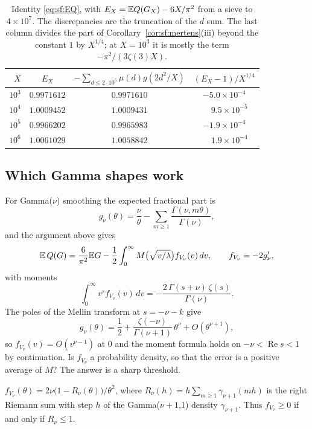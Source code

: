 \begin{table}[t]
\centering
\begin{tabular}{rccc}
\toprule
$X$ & $E_X$ & $-\sum_{d\le2\cdot10^5}\mu(d)g(2d^2/X)$ & $(E_X-1)/X^{1/4}$\\
\midrule
$10^3$ & $0.9971612$ & $0.9971610$ & $-5.0\times10^{-4}$\\
$10^4$ & $1.0009452$ & $1.0009431$ & $\phantom{-}9.5\times10^{-5}$\\
$10^5$ & $0.9966202$ & $0.9965983$ & $-1.9\times10^{-4}$\\
$10^6$ & $1.0061029$ & $1.0058842$ & $\phantom{-}1.9\times10^{-4}$\\
\bottomrule
\end{tabular}
\caption{Identity \eqref{eq:sf:EQ}, with $E_X=\mathbb{E} Q(G_X)-6X/\pi^2$ from a sieve to $4\times10^7$. The discrepancies are the truncation of the $d$ sum. The last column divides the part of Corollary~\ref{cor:sf:mertens}(iii) beyond the constant $1$ by $X^{1/4}$; at $X=10^3$ it is mostly the term $-\pi^2/(3\zeta(3)X)$.}
\label{tab:sf:EQ}
\end{table}

\subsection{Which Gamma shapes work}
For Gamma($\nu$) smoothing the expected fractional part is
\[
g_\nu(\theta)=\frac\nu\theta-\sum_{m\ge1}\frac{\Gamma(\nu,m\theta)}{\Gamma(\nu)},
\]
and the argument above gives
\[
\mathbb{E}\,Q(G)=\frac{6}{\pi^2}\mathbb{E} G-\frac12\int_0^\infty M\bigl(\sqrt{v/\lambda}\bigr)f_{V_\nu}(v)\,dv,\qquad f_{V_\nu}=-2g_\nu',
\]
with moments
\[
\int_0^\infty v^sf_{V_\nu}(v)\,dv=-\frac{2\,\Gamma(s+\nu)\,\zeta(s)}{\Gamma(\nu)} .
\]
The poles of the Mellin transform at $s=-\nu-k$ give
\[
g_\nu(\theta)=\frac12+\frac{\zeta(-\nu)}{\Gamma(\nu+1)}\,\theta^\nu+O(\theta^{\nu+1}),
\]
so $f_{V_\nu}(v)=O(v^{\nu-1})$ at $0$ and the moment formula holds on $-\nu<\operatorname{Re} s<1$ by continuation. Is $f_{V_\nu}$ a probability density, so that the error is a positive average of $M$? The answer is a sharp threshold.

\begin{lemma}\label{lem:sf:riemann}
$f_{V_\nu}(\theta)=2\nu\bigl(1-R_\nu(\theta)\bigr)/\theta^2$, where $R_\nu(h)=h\sum_{m\ge1}\gamma_{\nu+1}(mh)$ is the right Riemann sum with step $h$ of the Gamma($\nu+1$,1) density $\gamma_{\nu+1}$. Thus $f_{V_\nu}\ge0$ if and only if $R_\nu\le1$.
\end{lemma}

